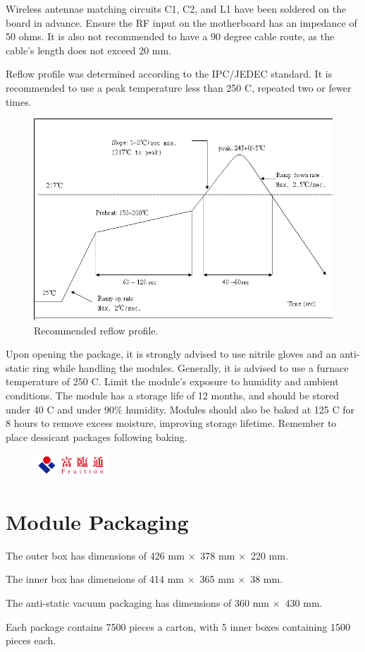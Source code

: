 \documentclass{scrreprt}
\newcommand{\pchapter}[1]{
	\begingroup\let\clearpage\relax
	\newpage
	\begin{figure}[H]
		\includegraphics[width=0.25\textwidth]{logo.jpeg}
	\end{figure}
	\chapter{#1}
	\endgroup
}
\newcommand{\x}{$\times$}
\begin{document}
\begin{CJK*}{UTF8}{gbsn}
Wireless antennae matching circuits C1, C2, and L1 have been soldered on the
board in advance. Ensure the RF input on the motherboard has an impedance of 50
ohms. It is also not recommended to have a 90 degree cable route, as the cable's
length does not exceed 20 mm.

Reflow profile was determined according to the IPC/JEDEC standard. It is
recommended to use a peak temperature less than 250 \degree C, repeated two or
fewer times.

\begin{figure}[H]
\caption{Recommended reflow profile.}
\includegraphics[width=\textwidth]{reflow.png}
\end{figure}

Upon opening the package, it is strongly advised to use nitrile gloves and an
anti-static ring while handling the modules. Generally, it is advised to use a
furnace temperature of 250 \degree C. Limit the module's exposure to humidity
and ambient conditions. The module has a storage life of 12 months, and should
be stored under 40 \degree C and under 90\% humidity. Modules should also be
baked at 125 \degree C for 8 hours to remove excess moisture, improving storage
lifetime. Remember to place dessicant packages following baking.

\pchapter{Module Packaging}

The outer box has dimensions of 426 mm \x\ 378 mm \x\ 220 mm.

The inner box has dimensions of 414 mm \x\ 365 mm \x\ 38 mm.

The anti-static vacuum packaging has dimensions of 360 mm \x\ 430 mm.

Each package contains 7500 pieces a carton, with 5 inner boxes containing 1500
pieces each.


\end{CJK*}
\end{document}
